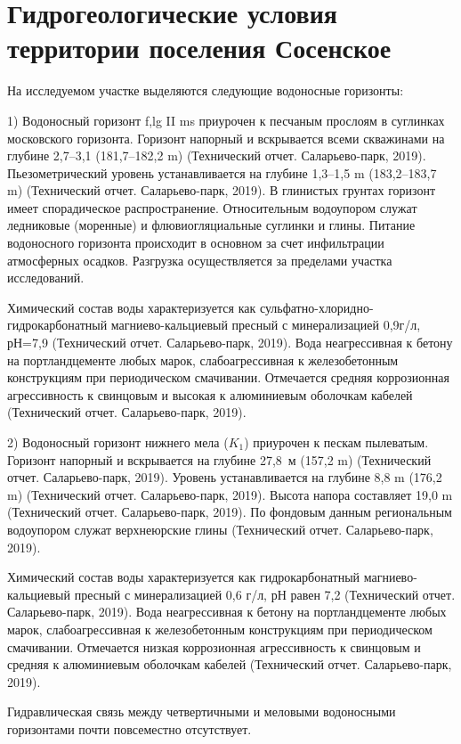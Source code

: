 \chapter{Гидрогеологические условия территории поселения Сосенское}\label{ch:ch4}

На исследуемом участке выделяются следующие водоносные горизонты:

1) Водоносный горизонт f,lg II ms приурочен к песчаным прослоям в суглинках московского горизонта. 
Горизонт напорный и вскрывается всеми скважинами 
на глубине 2,7--3,1 (181,7--182,2 \si{\meter}) (Технический отчет. Саларьево-парк, 2019). 
Пьезометрический уровень устанавливается 
на глубине 1,3--1,5 \si{\meter} (183,2--183,7 \si{\meter}) (Технический отчет. Саларьево-парк, 2019). 
В глинистых грунтах горизонт имеет спорадическое распространение. 
Относительным водоупором служат ледниковые (моренные) 
и флювиогляциальные суглинки и глины. Питание водоносного горизонта 
происходит в основном за счет инфильтрации атмосферных осадков. 
Разгрузка осуществляется за пределами участка исследований.

Химический состав воды характеризуется как сульфатно-хлоридно-гидрокарбонатный 
магниево-кальциевый пресный 
с минерализацией 0,9г/л, рН=7,9 (Технический отчет. Саларьево-парк, 2019). Вода неагрессивная к бетону на 
портландцементе любых марок, слабоагрессивная 
к железобетонным конструкциям при периодическом смачивании. 
Отмечается средняя коррозионная агрессивность 
к свинцовым и высокая к алюминиевым оболочкам кабелей (Технический отчет. Саларьево-парк, 2019).

2) Водоносный горизонт нижнего мела ($K_1$) приурочен к пескам пылеватым. 
Горизонт напорный и вскрывается 
на глубине 27,8~м (157,2 \si{\meter}) 
(Технический отчет. Саларьево-парк, 2019). Уровень устанавливается 
на глубине 8,8 \si{\meter} (176,2 \si{\meter}) (Технический отчет. Саларьево-парк, 2019). 
Высота напора составляет 19,0 \si{\meter} (Технический отчет. Саларьево-парк, 2019). 
По фондовым данным региональным водоупором 
служат верхнеюрские глины (Технический отчет. Саларьево-парк, 2019).

Химический состав воды характеризуется как гидрокарбонатный магниево-кальциевый 
пресный с минерализацией 0,6 г/л, 
рН равен 7,2 (Технический отчет. Саларьево-парк, 2019). 
Вода неагрессивная к бетону на портландцементе любых марок, 
слабоагрессивная к железобетонным конструкциям 
при периодическом смачивании. Отмечается низкая коррозионная агрессивность 
к свинцовым и средняя к алюминиевым оболочкам кабелей (Технический отчет. Саларьево-парк, 2019).

Гидравлическая связь между четвертичными и меловыми водоносными горизонтами 
почти повсеместно отсутствует.